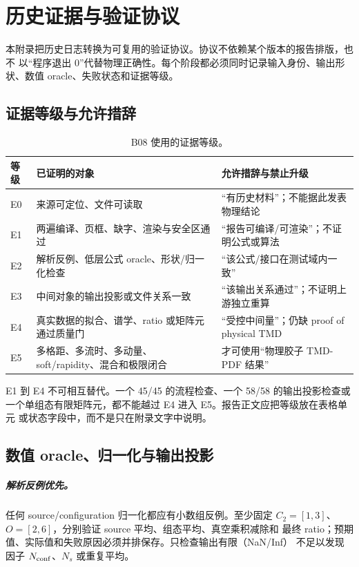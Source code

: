 \chapter{历史证据与验证协议}\label{sec:b08-appendix-evidence}
本附录把历史日志转换为可复用的验证协议。协议不依赖某个版本的报告排版，也不
以“程序退出 0”代替物理正确性。每个阶段都必须同时记录输入身份、输出形状、数值
oracle、失败状态和证据等级。

\section{证据等级与允许措辞}

\begin{table}[htbp]
\centering
\caption{B08 使用的证据等级。}
\label{tab:b08-evidence-levels}
\small
\begin{tabularx}{\textwidth}{>{\raggedright\arraybackslash}p{1.4cm}>{\raggedright\arraybackslash}p{4.4cm}>{\raggedright\arraybackslash}X}
\toprule
等级 & 已证明的对象 & 允许措辞与禁止升级 \\
\midrule
E0 & 来源可定位、文件可读取 & “有历史材料”；不能据此发表物理结论 \\
E1 & 两遍编译、页框、缺字、渲染与安全区通过 & “报告可编译/可渲染”；不证明公式或算法 \\
E2 & 解析反例、低层公式 oracle、形状/归一化检查 & “该公式/接口在测试域内一致” \\
E3 & 中间对象的输出投影或文件关系一致 & “该输出关系通过”；不证明上游独立重算 \\
E4 & 真实数据的拟合、谱学、ratio 或矩阵元通过质量门 & “受控中间量”；仍缺 proof of physical TMD \\
E5 & 多格距、多流时、多动量、soft/rapidity、混合和极限闭合 & 才可使用“物理胶子 TMD-PDF 结果” \\
\bottomrule
\end{tabularx}
\end{table}

E1 到 E4 不可相互替代。一个 45/45 的流程检查、一个 58/58 的输出投影检查或
一个单组态有限矩阵元，都不能越过 E4 进入 E5。报告正文应把等级放在表格单元
或状态字段中，而不是只在附录文字中说明。

\section{数值 oracle、归一化与输出投影}

\paragraph{解析反例优先。}
任何 source/configuration 归一化都应有小数组反例。至少固定
\(C_2=[1,3]\)、\(O=[2,6]\)，分别验证 source 平均、组态平均、真空乘积减除和
最终 ratio；预期值、实际值和失败原因必须并排保存。只检查输出有限（NaN/Inf）
不足以发现因子 \(N_{\rm conf}\)、\(N_s\) 或重复平均。

